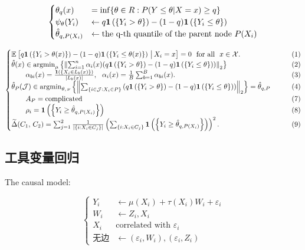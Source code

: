 \documentclass[aos]{imsart}
\theoremstyle{plain}
\theoremstyle{definition}
\theoremstyle{remark}
\begin{document}
\begin{CJK}{UTF8}{gbsn}
$$
\begin{cases}
\theta_q(x) &= \inf \{\theta \in R: P(Y \leq \theta|X=x) \geq q\} \\
\psi_\theta(Y_i) &\leftarrow q \1\p{\cb{Y_i > \theta}} - (1 - q) \1\p{\cb{Y_i \leq \theta}} \\
\htheta_{q, P(X_i)} &\leftarrow \text{the q-th quantile of the parent node } P(X_i)
\end{cases}
$$


\begin{equation*}
\begin{cases}
\EE{ q \1\p{\cb{Y_i > \theta(x)}} - (1 - q) \1\p{\cb{Y_i \leq \theta(x)}} \cond X_i = x} = 0 \ \text{ for all } \ x \in \xx. &\qquad (1) \\
\htheta(x) \in \argmin_{\mu} \cb{\Norm{\sum_{i = 1}^n \alpha_i(x)(q \1\p{\cb{Y_i > \theta}} - (1 - q) \1\p{\cb{Y_i \leq \theta}})}_2} &\qquad (2) \\
\qquad  \alpha_{bi}(x) = \frac{\1\p{\cb{X_i \in L_b(x)}}}{\abs{L_b(x)}}, \ \ \alpha_i(x) = \frac{1}{B} \sum_{b = 1}^B \alpha_{bi}(x).  &\qquad (3) \\
\htheta_P(\mathcal{J}) \in \argmin_{\theta, \, \nu} \cb{\Norm{\sum_{\cb{i\in\mathcal{J} : X_i \in P}} \, (q \1\p{\cb{Y_i > \theta}} - (1 - q) \1\p{\cb{Y_i \leq \theta}})}_2} = \htheta_{q, P}   &\qquad (4) \\
\qquad A_P = \text{complicated} &\qquad (7) \\
\qquad  \rho_i = \1\p{\cb{Y_i \geq \htheta_{q, P(X_i)}}}  &\qquad (8)\\
\tDelta(C_1, \, C_2) =  \sum_{j = 1}^2\frac{1}{\abs{\cb{i : X_i \in C_j}}}\p{ \sum_{\cb{i : X_i \in C_j}} \1\p{\cb{Y_i \geq \htheta_{q, P(X_i)}}}}^2. &\qquad (9)
\end{cases}
\end{equation*}

\subsection{工具变量回归}

The causal model:

\begin{equation*}
\begin{cases}
Y_i &\gets \mu(X_i) + \tau(X_i) W_i + \varepsilon_i \\
W_i &\gets Z_i, X_i \\
X_i &\text{correlated with } \varepsilon_i \\
\text{无边} &\gets (\varepsilon_i, W_i), (\varepsilon_i, Z_i)
\end{cases}
\end{equation*}


\end{CJK}
\end{document}
